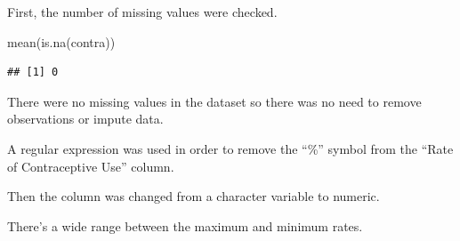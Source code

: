 \documentclass[
]{article}
\newenvironment{Shaded}{\begin{snugshade}}{\end{snugshade}}
\newcommand{\AttributeTok}[1]{\textcolor[rgb]{0.77,0.63,0.00}{#1}}
\newcommand{\FunctionTok}[1]{\textcolor[rgb]{0.00,0.00,0.00}{#1}}
\newcommand{\NormalTok}[1]{#1}
\newcommand{\OtherTok}[1]{\textcolor[rgb]{0.56,0.35,0.01}{#1}}
\newcommand{\SpecialCharTok}[1]{\textcolor[rgb]{0.00,0.00,0.00}{#1}}
\newcommand{\StringTok}[1]{\textcolor[rgb]{0.31,0.60,0.02}{#1}}
\begin{document}
First, the number of missing values were checked.

\begin{Shaded}
\begin{Highlighting}[]
\FunctionTok{mean}\NormalTok{(}\FunctionTok{is.na}\NormalTok{(contra))}
\end{Highlighting}
\end{Shaded}

\begin{verbatim}
## [1] 0
\end{verbatim}

There were no missing values in the dataset so there was no need to
remove observations or impute data.

A regular expression was used in order to remove the ``\%'' symbol from
the ``Rate of Contraceptive Use'' column.

\begin{Shaded}
\end{Shaded}

Then the column was changed from a character variable to numeric.

\begin{Shaded}
\end{Shaded}

There's a wide range between the maximum and minimum rates.

\begin{Shaded}
\end{Shaded}
\end{document}
